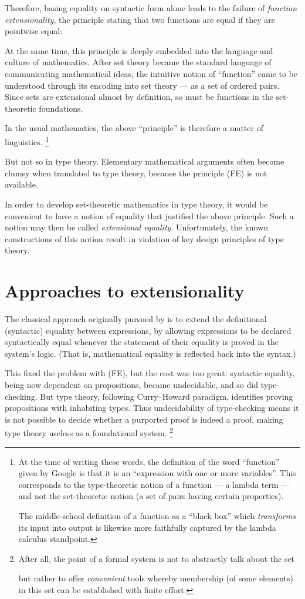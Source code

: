 \documentclass[10pt]{article}
\begin{document}
Therefore, basing equality on syntactic form alone leads to the
failure of \emph{function extensionality}, the principle stating that
two functions are equal if they are pointwise equal:

At the same time, this principle is deeply embedded into the
language and culture of mathematics.  After set theory
became the standard language of 
communicating mathematical ideas, the intuitive notion of ``function''
came to be understood through its encoding into
set theory ---  as a set of ordered pairs.
Since sets are extensional almost by definition, so must be functions in
the set-theoretic foundations.

In the usual mathematics, the above ``principle'' is therefore a
matter of linguistics.
\footnote{At the time of
writing these words, the definition of the word ``function'' given by
Google is that it is an ``expression with one or more variables''.
This corresponds to the type-theoretic notion of a function ---  a lambda term ---
and not the set-theoretic notion (a set of pairs having certain
properties).

The middle-school definition of a function as a ``black box''
which \emph{transforms} its input into output is
likewise more faithfully captured by the lambda calculus standpoint.
}

But not so in type theory. Elementary mathematical arguments often become
clumsy when translated to type theory, because the principle (FE) is
not available.

In order to develop set-theoretic mathematics in type theory,
it would be convenient to have a notion of equality that
justified the above principle.  Such a notion may then be called
\emph{extensional equality}.  Unfortunately, the known constructions
of this notion result in violation of key design principles of type theory.

\section{Approaches to extensionality}

The classical approach originally pursued by \cite{itt} is
to extend the definitional (syntactic) equality between expressions,
by allowing expressions to be declared syntactically equal whenever
the statement of their equality is proved in the system's logic.
(That is, mathematical equality is reflected back into the syntax.)

This fixed the problem with (FE), but the cost was too great:
syntactic equality, being now dependent on propositions, became
undecidable, and so did type-checking.  But type theory, following
Curry--Howard paradigm, identifies proving propositions with
inhabiting types.  Thus undecidability of type-checking means it is
not possible to decide whether a purported proof is indeed a proof,
making type theory useless as a foundational system. \footnote{
After all, the point of a formal system is not to abstractly talk
about the set

but rather to offer \emph{convenient} tools whereby membership (of some elements)
in this set can be established with finite effort.}
\end{document}
